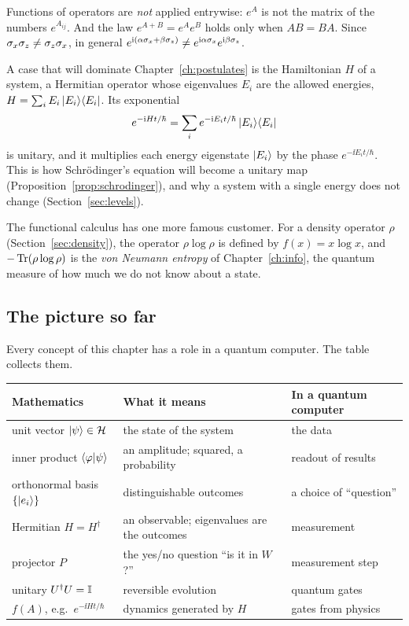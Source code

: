 \begin{pitfall}
  Functions of operators are \emph{not} applied entrywise: $e^A$ is not the matrix of the numbers $e^{A_{ij}}$. And the law $e^{A+B}=e^Ae^B$ holds only when $AB=BA$. Since $\sigma_x\sigma_z\neq\sigma_z\sigma_x$, in general $e^{\mathrm{i}(\alpha\sigma_x+\beta\sigma_z)}\neq e^{\mathrm{i}\alpha\sigma_x}e^{\mathrm{i}\beta\sigma_z}$.
\end{pitfall}

A case that will dominate Chapter~\ref{ch:postulates} is the Hamiltonian $H$ of a system, a Hermitian operator whose eigenvalues $E_i$ are the allowed energies, $H=\sum_iE_i\left|E_i\right\rangle\!\left\langle E_i\right|$. Its exponential
\[
  e^{-\mathrm{i} Ht/\hbar}=\sum_ie^{-\mathrm{i} E_it/\hbar}\left|E_i\right\rangle\!\left\langle E_i\right|
\]
is unitary, and it multiplies each energy eigenstate $\left|E_i\right\rangle$ by the phase $e^{-\ii E_it/\hbar}$. This is how Schr\"odinger's equation will become a unitary map (Proposition~\ref{prop:schrodinger}), and why a system with a single energy does not change (Section~\ref{sec:levels}).

\begin{lookahead}
  The functional calculus has one more famous customer. For a density operator $\rho$ (Section~\ref{sec:density}), the operator $\rho\log\rho$ is defined by $f(x)=x\log x$, and $-\operatorname{Tr}(\rho\log\rho)$ is the \emph{von Neumann entropy} of Chapter~\ref{ch:info}, the quantum measure of how much we do not know about a state.
\end{lookahead}

\subsection{The picture so far}

Every concept of this chapter has a role in a quantum computer. The table collects them.

\begin{center}
\small
\begin{tabular}{@{}>{\raggedright\arraybackslash}p{}>{\raggedright\arraybackslash}p{}>{\raggedright\arraybackslash}p{}@{}}
  \toprule
  Mathematics & What it means & In a quantum computer\\
  \midrule
  unit vector $\left|\psi\right\rangle\in\mathcal{H}$ & the state of the system & the data\\
  inner product $\left\langle\varphi\middle|\psi\right\rangle$ & an amplitude; squared, a probability & readout of results\\
  orthonormal basis $\{\left|e_i\right\rangle\}$ & distinguishable outcomes & a choice of ``question''\\
  Hermitian $H=H^\dagger$ & an observable; eigenvalues are the outcomes & measurement\\
  projector $P$ & the yes/no question ``is it in $W$?'' & measurement step\\
  unitary $U^\dagger U=\mathbb{I}$ & reversible evolution & quantum gates\\
  $f(A)$, e.g.\ $e^{-\ii Ht/\hbar}$ & dynamics generated by $H$ & gates from physics\\
  \bottomrule
\end{tabular}
\end{center}


